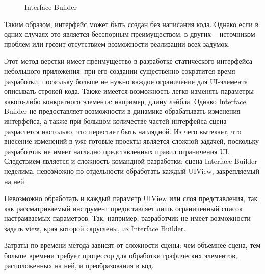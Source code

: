 \begin{figure}[h!]
	\caption{Interface Builder}
	\label{fig:builder}
\end{figure}

Таким образом, интерфейс может быть создан без написания кода. 
Однако если в одних случаях это является бесспорным преимуществом, в других -- источником проблем или грозит отсутствием возможности реализации всех задумок.

Этот метод верстки имеет преимущество в разработке статического интерфейса небольшого приложения: при его создании существенно сократится время разработки, поскольку больше не нужно каждое ограничение для UI-элемента описывать строкой кода. 
Также имеется возможность легко изменять параметры какого-либо конкретного элемента: например, длину лэйбла. 
Однако Interface Builder не предоставляет возможности в динамике обрабатывать изменения интерфейса, а также при большом количестве частей интерфейса сцена разрастется настолько, что перестает быть наглядной. 
Из чего вытекает, что внесение изменений в уже готовые проекты является сложной задачей, поскольку разработчик не имеет наглядно представленных правил ограничения UI. 
Следствием является и сложность командной разработки: сцена Interface Builder неделима, невозможно по отдельности обработать каждый UIView, закрепляемый на ней.

Невозможно обработать и каждый параметр UIView или слоя представления, так как рассматриваемый инструмент предоставляет лишь ограниченный список настраиваемых параметров. 
Так, например, разработчик не имеет возможности задать view, края которой скруглены, из Interface Builder.

Затраты по времени метода зависят от сложности сцены: чем объемнее сцена, тем больше времени требует процессор для обработки графических элементов, расположенных на ней, и преобразования в код. 


